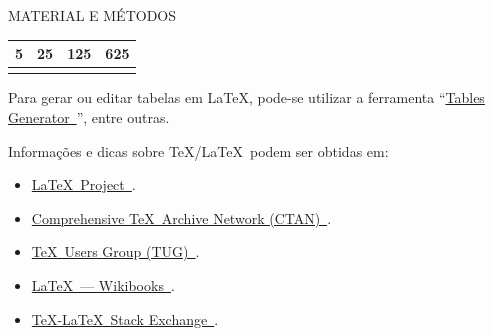\documentclass[%
  final,%
  english,%
  brazilian,%
]{beamer}
\begin{document}
\begin{frame}[t, fragile = singleslide]
\begin{columns}[t, onlytextwidth]
\begin{column}{0.49\textwidth}
\begin{block}{MATERIAL E MÉTODOS}
\begin{table}[!htb]
\begin{tabular*}{\columnwidth}{@{\extracolsep{\fill}}llll}
5     & 25        & 125       & 625       \\
\bottomrule
\addlinespace
\end{tabular*}
\end{table}
Para gerar ou editar tabelas em \LaTeX, pode-se utilizar a ferramenta \enquote{\href{http://www.tablesgenerator.com/}{Tables Generator~\linkicon}}, entre outras.
\par%
Informações e dicas sobre \TeX/\LaTeX\ podem ser obtidas em:
\begin{itemize}
\item \href{http://www.latex-project.org/}{\LaTeX\ Project~\linkicon}.
\item \href{http://www.ctan.org/}{Comprehensive \TeX\ Archive Network (CTAN)~\linkicon}.
\item \href{http://www.tug.org/}{\TeX\ Users Group (TUG)~\linkicon}.
\item \href{http://en.wikibooks.org/wiki/LaTeX/}{\LaTeX\ --- Wikibooks~\linkicon}.
\item \href{http://tex.stackexchange.com/}{\TeX-\LaTeX\ Stack Exchange~\linkicon}.
\end{itemize}
\end{block}
%
\end{column}
%
\end{columns}


\end{frame}
\end{document}

